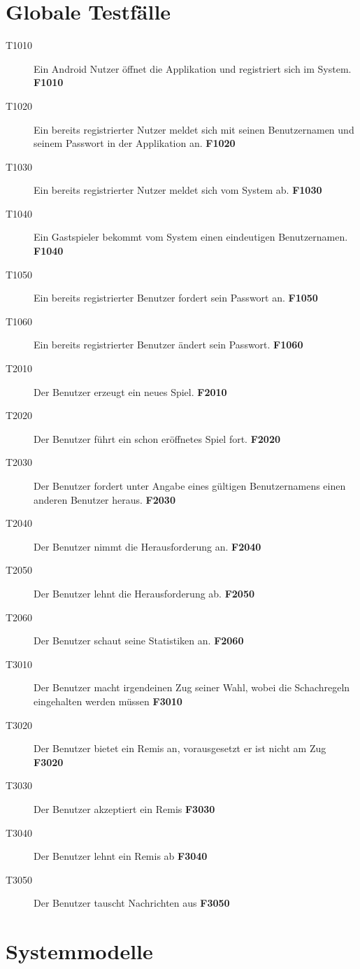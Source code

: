 \documentclass[parskip=full]{scrartcl}
\begin{document}
\section{Globale Testfälle}
\begin{description}
	\item[T1010] Ein Android Nutzer öffnet die Applikation und registriert sich im System. \textbf{F1010}
	\item[T1020] Ein bereits registrierter Nutzer meldet sich mit seinen Benutzernamen und seinem Passwort in der Applikation an. \textbf{F1020}
	\item[T1030] Ein bereits registrierter Nutzer meldet sich vom System ab. \textbf{F1030}
	\item[T1040] Ein Gastspieler bekommt vom System einen eindeutigen Benutzernamen. \textbf{F1040}
	\item[T1050] Ein bereits registrierter Benutzer fordert sein Passwort an. \textbf{F1050}
	\item[T1060] Ein bereits registrierter Benutzer ändert sein Passwort. \textbf{F1060}
	\item[T2010] Der Benutzer erzeugt ein neues Spiel. \textbf{F2010}
	\item[T2020] Der Benutzer führt ein schon eröffnetes Spiel fort. \textbf{F2020}
	\item[T2030] Der Benutzer fordert unter Angabe eines gültigen Benutzernamens einen anderen Benutzer heraus. \textbf{F2030}
	\item[T2040] Der Benutzer nimmt die Herausforderung an. \textbf{F2040}
	\item[T2050] Der Benutzer lehnt die Herausforderung ab. \textbf{F2050}
	\item[T2060] Der Benutzer schaut seine Statistiken an. \textbf{F2060}	
	\item[T3010] Der Benutzer macht irgendeinen Zug seiner Wahl, wobei die Schachregeln eingehalten werden müssen \textbf{F3010}
	\item[T3020] Der Benutzer bietet ein Remis an, vorausgesetzt er ist nicht am Zug \textbf{F3020}
	\item[T3030] Der Benutzer akzeptiert ein Remis \textbf{F3030}
	\item[T3040] Der Benutzer lehnt ein Remis ab \textbf{F3040}
	\item[T3050] Der Benutzer tauscht Nachrichten aus \textbf{F3050}
	
\end{description}
\pagebreak
\section{Systemmodelle}
\end{document}
